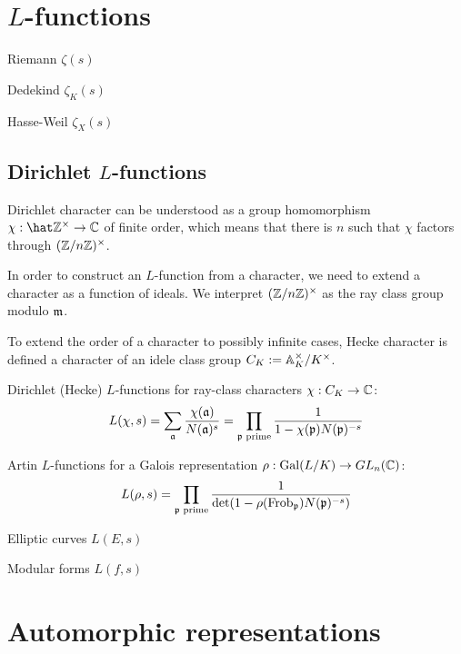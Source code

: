 \documentclass{../../large}
\DeclareMathOperator{\Frob}{Frob}
\begin{document}
\chapter{$L$-functions}
Riemann $\zeta(s)$

Dedekind $\zeta_K(s)$

Hasse-Weil $\zeta_X(s)$

\section{Dirichlet $L$-functions}

\begin{prb}
Dirichlet character can be understood as a group homomorphism $\chi:\hat\Z^\times\to\C$ of finite order, which means that there is $n$ such that $\chi$ factors through $(\mathbb{Z}/n\mathbb{Z})^\times$.

In order to construct an $L$-function from a character, we need to extend a character as a function of ideals.
We interpret $(\mathbb{Z}/n\mathbb{Z})^\times$ as the ray class group modulo $\mathfrak{m}$.

To extend the order of a character to possibly infinite cases, Hecke character is defined a character of an idele class group $C_K:=\mathbb{A}_K^\times/K^\times$.
\end{prb}


Dirichlet (Hecke) $L$-functions for ray-class characters $\chi:C_K\to\mathbb{C}$:
\[L(\chi,s)=\sum_{\mathfrak{a}}\frac{\chi(\mathfrak{a})}{N(\mathfrak{a})^s}=\prod_{\mathfrak{p}\text{ prime}}\frac1{1-\chi(\mathfrak{p})N(\mathfrak{p})^{-s}}\]

Artin $L$-functions for a Galois representation $\rho:\operatorname{Gal}(L/K)\to GL_n(\mathbb{C})$:
\[L(\rho,s)=\prod_{\fp\text{ prime}}\frac1{\det(1-\rho(\Frob_\fp)N(\fp)^{-s})}\]

Elliptic curves $L(E,s)$

Modular forms $L(f,s)$


\chapter{Automorphic representations}
\end{document}

